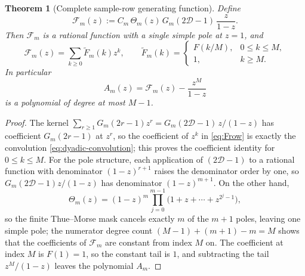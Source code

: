 \documentclass[11pt,oneside]{article}
\numberwithin{equation}{section}
\newtheorem{theorem}{Theorem}[section]
\theoremstyle{definition}
\theoremstyle{remark}
\newcommand{\Dop}{\mathcal D}
\newcommand{\ThetaTM}{\Theta}
\newcommand{\Frow}{\mathscr F}
\begin{document}
\begin{theorem}[Complete sample-row generating function]
\label{thm:row-ogf}
Define
\begin{equation}
 \Frow_m(z)
 :=C_m\,\ThetaTM_m(z)\,G_m(2\Dop-1)\,\frac{z}{1-z}.
 \label{eq:Frow}
\end{equation}
Then $\Frow_m$ is a rational function with a single simple pole at
$z=1$, and
\begin{equation}
 \Frow_m(z)=\sum_{k\ge0}\widetilde F_m(k)z^{k},
 \qquad
 \widetilde F_m(k)=
 \begin{cases}
 F(k/M),&0\le k\le M,\\
 1,&k\ge M.
 \end{cases}
 \label{eq:Frow-coeff}
\end{equation}
In particular
\begin{equation}
 \boxed{\;
 A_m(z)=\Frow_m(z)-\frac{z^{M}}{1-z}
 \;}
 \label{eq:AN-from-Frow}
\end{equation}
is a polynomial of degree at most $M-1$.
\end{theorem}

\begin{proof}
The kernel $\sum_{r\ge1}G_m(2r-1)z^{r}=G_m(2\Dop-1)\,z/(1-z)$ has
coefficient $G_m(2r-1)$ at $z^r$, so the coefficient of $z^k$ in
\eqref{eq:Frow} is exactly the convolution
\eqref{eq:dyadic-convolution}; this proves the coefficient identity for
$0\le k\le M$.  For the pole structure, each application of
$(2\Dop-1)$ to a rational function with denominator $(1-z)^{r+1}$
raises the denominator order by one, so
$G_m(2\Dop-1)z/(1-z)$ has denominator $(1-z)^{m+1}$.  On the other
hand,
\begin{equation}
 \ThetaTM_m(z)=(1-z)^{m}
 \prod_{j=0}^{m-1}\bigl(1+z+\cdots+z^{2^{j}-1}\bigr),
 \label{eq:theta-factor}
\end{equation}
so the finite Thue--Morse mask cancels exactly $m$ of the $m+1$ poles,
leaving one simple pole; the numerator degree count
$(M-1)+(m+1)-m=M$ shows that the coefficients of $\Frow_m$ are constant
from index $M$ on.  The coefficient at index $M$ is $F(1)=1$, so the
constant tail is $1$, and subtracting the tail $z^{M}/(1-z)$ leaves the
polynomial $A_m$.
\end{proof}
\end{document}
